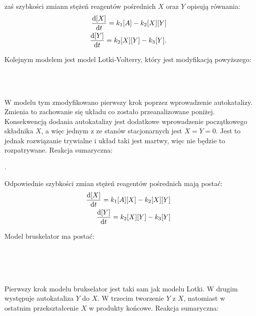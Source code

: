 \documentclass[10pt, a4paper, twoside, onecolumn]{article}
\numberwithin{equation}{section}
\begin{document}
	zaś szybkości zmiann stężeń reagentów pośrednich $X$ oraz $Y$ opisują równania: 
	\begin{equation}
	\begin{split}
		\dv{[X]}{t}=k_{1}[A]-k_{2}[X][Y] \\
		\dv{[Y]}{t}=k_{2}[X][Y]-k_{3}[Y].
	\end{split}
	\end{equation}\par
	Kolejnym modelem jest model Lotki-Volterry, który jest modyfikacją powyższego:
	\begin{center}
		 \\
		 \\
	\end{center}
	W modelu tym zmodyfikowano pierwszy krok poprzez wprowadzenie autokatalizy. Zmienia to zachowanie się układu co zostało przeanalizowane poniżej. Konsekwencją dodania autokatalizy jest dodatkowe wprowadzenie początkowego składnika \(X\), a więc jednym z ze stanów stacjonarnych jest \(X=Y=0\). Jest to jednak rozwiązanie trywialne i układ taki jest martwy, więc nie będzie to rozpatrywane. Reakcja sumaryczna:
	\begin{center}
		.
	\end{center}
	Odpowiednie szybkości zmian stężeń reagentów pośrednich mają postać:
	\begin{equation}
	\begin{split}
		\dv{[X]}{t}=k_{1}[A][X]-k_{2}[X][Y] \\
		\dv{[Y]}{t}=k_{2}[X][Y]-k_{3}[Y]
	\end{split}
	\end{equation}\par
	Model bruskelator ma postać:
	\begin{center}
		 \\
		 \\
		 \\
	\end{center}
	Pierwszy krok modelu brukselator jest taki sam jak modelu Lotki. W drugim występuje autokataliza \(Y\) do \(X\). W trzecim tworzenie \(Y\) z \(X\), natomiast w ostatnim przekształcenie \(X\) w produkty końcowe. Reakcja sumaryczna: 
\end{document}
